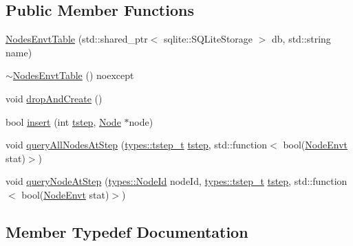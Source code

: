 \subsection*{Public Member Functions}
\begin{DoxyCompactItemize}
\item 
\mbox{\hyperlink{class_nodes_envt_table_a93f0ad92d25c9b8978e8b676a20bfb60}{Nodes\+Envt\+Table}} (std\+::shared\+\_\+ptr$<$ sqlite\+::\+S\+Q\+Lite\+Storage $>$ db, std\+::string name)
\item 
\mbox{\hyperlink{class_nodes_envt_table_afe10f484b5739e2ec6b71db5383dfbaa}{$\sim$\+Nodes\+Envt\+Table}} () noexcept
\item 
void \mbox{\hyperlink{class_nodes_envt_table_ae61d30cf684bee6c7c9d0dfd51b64523}{drop\+And\+Create}} ()
\item 
bool \mbox{\hyperlink{class_nodes_envt_table_ab38b9cb5f60394b1f5ae0ffdb08168be}{insert}} (int \mbox{\hyperlink{thread__vessels_8cpp_a84bc73d278de929ec9974e1a95d9b23a}{tstep}}, \mbox{\hyperlink{class_node}{Node}} $\ast$node)
\item 
void \mbox{\hyperlink{class_nodes_envt_table_a693b8d01839cc09d8190e3367254fce5}{query\+All\+Nodes\+At\+Step}} (\mbox{\hyperlink{namespacetypes_a9dc53a5ce11a196d82a6983030de8028}{types\+::tstep\+\_\+t}} \mbox{\hyperlink{thread__vessels_8cpp_a84bc73d278de929ec9974e1a95d9b23a}{tstep}}, std\+::function$<$ bool(\mbox{\hyperlink{class_nodes_envt_table_adbc6a037efe1edee85eab03779c0b151}{Node\+Envt}} stat)$>$)
\item 
void \mbox{\hyperlink{class_nodes_envt_table_a09d6dbe9524748152f1889b2d07ddcd6}{query\+Node\+At\+Step}} (\mbox{\hyperlink{classtypes_1_1_node_id}{types\+::\+Node\+Id}} node\+Id, \mbox{\hyperlink{namespacetypes_a9dc53a5ce11a196d82a6983030de8028}{types\+::tstep\+\_\+t}} \mbox{\hyperlink{thread__vessels_8cpp_a84bc73d278de929ec9974e1a95d9b23a}{tstep}}, std\+::function$<$ bool(\mbox{\hyperlink{class_nodes_envt_table_adbc6a037efe1edee85eab03779c0b151}{Node\+Envt}} stat)$>$)
\end{DoxyCompactItemize}


\subsection{Member Typedef Documentation}
\mbox{\label{class_nodes_envt_table_adbc6a037efe1edee85eab03779c0b151}} 
